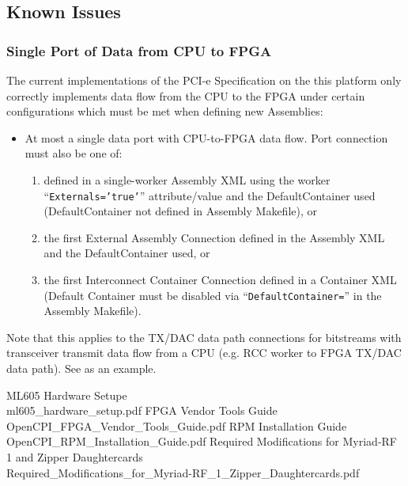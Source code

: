 \documentclass{article}
\begin{document}
\subsection*{Known Issues}
\subsubsection*{Single Port of Data from CPU to FPGA} %
\label{bug:3783}
The current implementations of the PCI-e Specification on the this platform only correctly implements data flow from the CPU to the FPGA under certain configurations which must be met when defining new Assemblies:
\begin{itemize}
\item At most a single data port with CPU-to-FPGA data flow. Port connection must also be one of:
\begin{enumerate}
\item defined in a single-worker Assembly XML using the worker ``\texttt{Externals='true'}'' attribute/value and the DefaultContainer used (DefaultContainer not defined in Assembly Makefile), or
\item the first External Assembly Connection defined in the Assembly XML and the DefaultContainer used, or
\item the first Interconnect Container Connection defined in a Container XML (Default Container must be disabled via ``\texttt{DefaultContainer=}'' in the Assembly Makefile).
\end{enumerate}
\end{itemize}
Note that this applies to the TX/DAC data path connections for bitstreams with transceiver transmit data flow from a CPU (e.g. RCC worker to FPGA TX/DAC data path). See  as an example.


\pagebreak
  \begin{thebibliography}{1}


   ML605 Hardware Setupe\\
	 ml605\_hardware\_setup.pdf
   FPGA Vendor Tools Guide\\
	 OpenCPI\_FPGA\_Vendor\_Tools\_Guide.pdf
	    RPM Installation Guide\\
	 OpenCPI\_RPM\_Installation\_Guide.pdf
	    Required Modifications for Myriad-RF 1 and Zipper Daughtercards\\
	 Required\_Modifications\_for\_Myriad-RF\_1\_Zipper\_Daughtercards.pdf

  \end{thebibliography}
\end{document}
